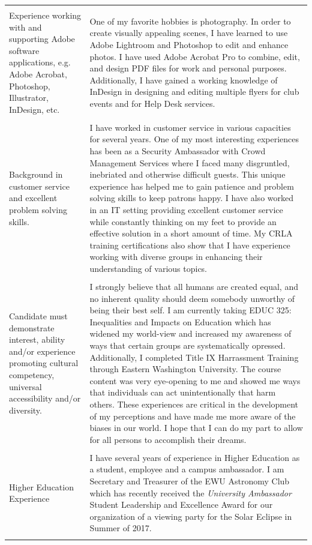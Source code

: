 \documentclass[a4paper,10pt]{article}
\begin{document}
\begin{longtable}{|p{.35\linewidth}|p{.6\linewidth}|}
	&\\
	Experience working with and supporting Adobe software applications, e.g. Adobe Acrobat, Photoshop, Illustrator, InDesign, etc.
	& One of my favorite hobbies is photography. In order to create visually appealing scenes, I have learned to use Adobe Lightroom and Photoshop to edit and enhance photos. I have used Adobe Acrobat Pro to combine, edit, and design PDF files for work and personal purposes. Additionally, I have gained a working knowledge of InDesign in designing and editing multiple flyers for club events and for Help Desk services.\\
	&\\
	Background in customer service and excellent problem solving skills.
	& I have worked in customer service in various capacities for several years. One of my most interesting experiences has been as a Security Ambassador with Crowd Management Services where I faced many disgruntled, inebriated and otherwise difficult guests. This unique experience has helped me to gain patience and problem solving skills to keep patrons happy. I have also worked in an IT setting providing excellent customer service while constantly thinking on my feet to provide an effective solution in a short amount of time. My CRLA training certifications also show that I have experience working with diverse groups in enhancing their understanding of various topics.\\
	&\\
	Candidate must demonstrate interest, ability and/or experience promoting cultural competency, universal accessibility and/or diversity.
	& I strongly believe that all humans are created equal, and no inherent quality should deem somebody unworthy of being their best self. I am currently taking EDUC 325: Inequalities and Impacts on Education which has widened my world-view and increased my awareness of ways that certain groups are systematically opressed. Additionally, I completed Title IX Harrassment Training through Eastern Washington University. The course content was very eye-opening to me and showed me ways that individuals can act unintentionally that harm others. These experiences are critical in the development of my perceptions and have made me more aware of the biases in our world. I hope that I can do my part to allow for all persons to accomplish their dreams.\\
	&\\
	Higher Education Experience & I have several years of experience in Higher Education as a student, employee and a campus ambassador. I am Secretary and Treasurer of the EWU Astronomy Club which has recently received the \textit{University Ambassador} Student Leadership and Excellence Award for our organization of a viewing party for the Solar Eclipse in Summer of 2017.\\
	&\\

\end{longtable}
\end{document}
